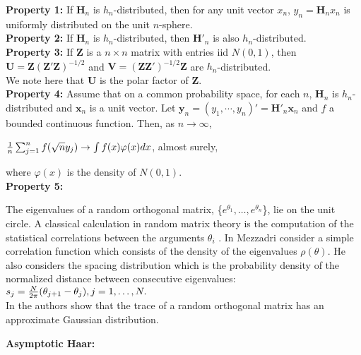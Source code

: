 \documentclass[a4paper]{article}
\begin{document}
\textbf{Property 1:}
If $\textbf{H}_n$ is $h_n$-distributed, then for any unit vector $x_n$, $y_n = \textbf{H}_nx_n$ 
is uniformly distributed on the unit $n$-sphere.\\

\textbf{Property 2:}
If $\textbf{H}_n$ is $h_n$-distributed, then $\textbf{H}'_n$ is also $h_n$-distributed.\\

\textbf{Property 3:}
If $\textbf{Z}$ is a $n\times n$ matrix with entries iid $N(0,1)$, then $\textbf{U} = \textbf{Z}(\textbf{Z}′\textbf{Z})^{−1/2}$ 
and $\textbf{V} = (\textbf{Z}\textbf{Z}')^{−1/2}\textbf{Z}$  are $h_n$-distributed.\\
We note here that $\textbf{U}$ is the polar factor of $\textbf{Z}$.\\

\textbf{Property 4:}
Assume that on a common probability space, for each $n$, $\textbf{H}_n$  is $h_n$-distributed and $\textbf{x}_n$ is 
a unit vector. Let $\textbf{y}_n = (y_1,\cdots , y_n)′ = \textbf{H}'_n\textbf{x}_n$ and $f$ a bounded continuous function. 
Then, as $ n \to \infty$, 
\begin{center}
${{1}\over{n}} \sum_{j=1}^{n}f(\sqrt{n}y_j) \to \int f(x)\varphi(x)dx$, almost surely, \\
\end{center}
where $\varphi(x)$ is the density of $N(0,1)$.\\

\textbf{Property 5:}

The eigenvalues of a random orthogonal matrix, \{$e^{\theta_1},\ldots,e^{\theta_n}$\}, lie on the unit circle.
A classical calculation in random matrix theory is the computation of the statistical correlations 
between the arguments $\theta_i$ \cite{mehta2004random}. In \cite{ANU:298726} Mezzadri consider a simple 
correlation function which consists of the density of the eigenvalues $\rho(\theta)$. He also 
considers the spacing distribution which is the probability density of the normalized distance 
between consecutive eigenvalues: \\

 $s_j = {N \over {2\pi}} ({\theta_{j+1}} - {\theta_j}), j = 1, \ldots, N.$ \\

In \cite{DiaconisSh94} the authors show that the trace of a random orthogonal matrix has an approximate 
Gaussian distribution.

\textbf{Asymptotic Haar:}
\end{document}
